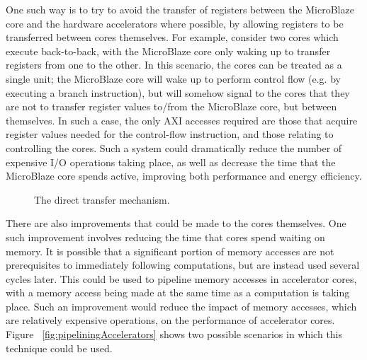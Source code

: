 \documentclass{UoYCSproject}
\begin{document}
One such way is to try to avoid the transfer of registers between the MicroBlaze core and the hardware accelerators where
possible, by allowing registers to be transferred between cores themselves. For example, consider two cores which
execute back-to-back, with the MicroBlaze core only waking up to transfer registers from one to the other. In this scenario,
the cores can be treated as a single unit; the MicroBlaze core will wake up to perform control flow (e.g. by executing a branch
instruction), but will somehow signal to the cores that they are not to transfer register values to/from the MicroBlaze core,
but between themselves. In such a case, the only AXI accesses required are those that acquire register values needed for the
control-flow instruction, and those relating to controlling the cores. Such a system could dramatically reduce the number
of expensive I/O operations taking place, as well as decrease the time that the MicroBlaze core spends active,
improving both performance and energy efficiency.

\begin{figure}[H]
\caption{The direct transfer mechanism.}
\label{fig:directTransfer}
\end{figure}

There are also improvements that could be made to the cores themselves. One such improvement involves reducing the time
that cores spend waiting on memory. It is possible that a significant portion of memory accesses are not prerequisites to
immediately following computations, but are instead used several cycles later. This could be used to pipeline memory accesses
in accelerator cores, with a memory access being made at the same time as a computation is taking place. Such an improvement
would reduce the impact of memory accesses, which are relatively expensive operations, on the performance of accelerator cores.
Figure ~\ref{fig:pipeliningAccelerators} shows two possible scenarios in which this technique could be used.
\end{document}
